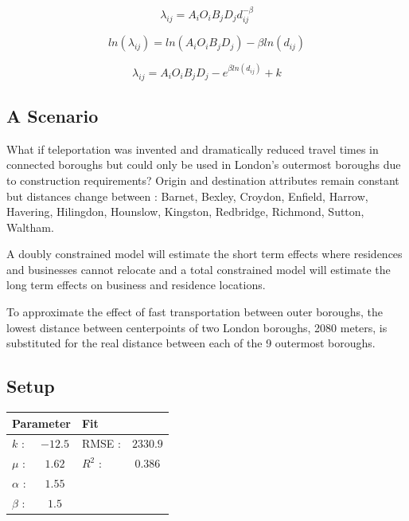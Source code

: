 \documentclass[11pt]{article} %
\begin{document}

\begin{equation}
\lambda_{ij} = A_i O_i  B_j D_j d_{ij}^{-\beta}
\end{equation}

\begin{equation}
ln(\lambda_{ij}) = ln(A_i O_i  B_j D_j) - \beta ln( d_{ij})
\end{equation}


\begin{equation}
\lambda_{ij} = A_i O_i  B_j D_j - e ^{ \beta ln( d_{ij})} + k
\end{equation}



\subsection{A Scenario}

What if teleportation  was invented and dramatically reduced travel times in connected boroughs but could only be used in London's outermost boroughs due to construction requirements? Origin and destination attributes remain constant but distances change between : Barnet, Bexley, Croydon, Enfield, Harrow, Havering, Hilingdon, Hounslow, Kingston, Redbridge, Richmond, Sutton, Waltham. 

A doubly constrained model will estimate the short term effects where residences and businesses cannot relocate and a total constrained model will estimate the long term effects on business and residence locations. 

To approximate the effect of fast transportation between outer boroughs, the lowest distance between centerpoints of two London boroughs, 2080 meters, is substituted for the real distance between each of the 9 outermost boroughs. 

\subsection{Setup}

\begin{table}
\centering
\begin{tabular}{lclc}
 \multicolumn{2}{l}{Parameter} 	& \multicolumn{2}{l}{Fit } \\ \hline	 
 $k$ : 		& $-12.5$ 	& RMSE :	&  $2330.9$	  	\\
 $\mu$ :	& $1.62$	& $R^2$ :	&  	$0.386$  	\\
 $\alpha$ :	& $1.55$	&  			&  	  			\\
 $\beta$ :	& $1.5$	& 	 		&
\end{tabular}
\label{unconstrained}
\end{table} 
\end{document}
